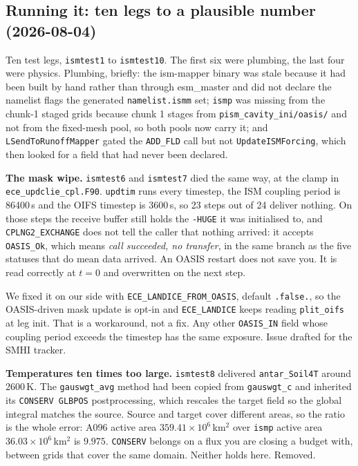 \documentclass[11pt,a4paper]{article}
\newcommand{\code}[1]{\texttt{\small #1}}
\begin{document}
\subsection{Running it: ten legs to a plausible number (2026-08-04)}
\label{sec:running}

Ten test legs, \code{ismtest1} to \code{ismtest10}. The first six were plumbing, the last four were
physics. Plumbing, briefly: the ism-mapper binary was stale because it had been built by hand
rather than through esm\_master and did not declare the namelist flags the generated
\code{namelist.ismm} set; \code{ismp} was missing from the chunk-1 staged grids because chunk 1
stages from \code{pism\_cavity\_ini/oasis/} and not from the fixed-mesh pool, so both pools now
carry it; and \code{LSendToRunoffMapper} gated the \code{ADD\_FLD} call but not
\code{UpdateISMForcing}, which then looked for a field that had never been declared.

\medskip\noindent
\textbf{The mask wipe.} \code{ismtest6} and \code{ismtest7} died the same way, at the clamp in
\code{ece\_updclie\_cpl.F90}. \code{updtim} runs every timestep, the ISM coupling period is
86400\,s and the OIFS timestep is 3600\,s, so 23 steps out of 24 deliver nothing. On those steps
the receive buffer still holds the \code{-HUGE} it was initialised to, and \code{CPLNG2\_EXCHANGE}
does not tell the caller that nothing arrived: it accepts \code{OASIS\_Ok}, which means \emph{call
succeeded, no transfer}, in the same branch as the five statuses that do mean data arrived. An
OASIS restart does not save you. It is read correctly at $t=0$ and overwritten on the next step.

We fixed it on our side with \code{ECE\_LANDICE\_FROM\_OASIS}, default \code{.false.}, so the
OASIS-driven mask update is opt-in and \code{ECE\_LANDICE} keeps reading \code{plit\_oifs} at leg
init. That is a workaround, not a fix. Any other \code{OASIS\_IN} field whose coupling period
exceeds the timestep has the same exposure. Issue drafted for the SMHI tracker.

\medskip\noindent
\textbf{Temperatures ten times too large.} \code{ismtest8} delivered \code{antar\_Soil4T} around
2600\,K. The \code{gauswgt\_avg} method had been copied from \code{gauswgt\_c} and inherited its
\code{CONSERV GLBPOS} postprocessing, which rescales the target field so the global integral
matches the source. Source and target cover different areas, so the ratio is the whole error:
A096 active area $359.41\times10^6$\,km$^2$ over \code{ismp} active area $36.03\times10^6$\,km$^2$
is $9.975$. \code{CONSERV} belongs on a flux you are closing a budget with, between grids that
cover the same domain. Neither holds here. Removed.
\end{document}
